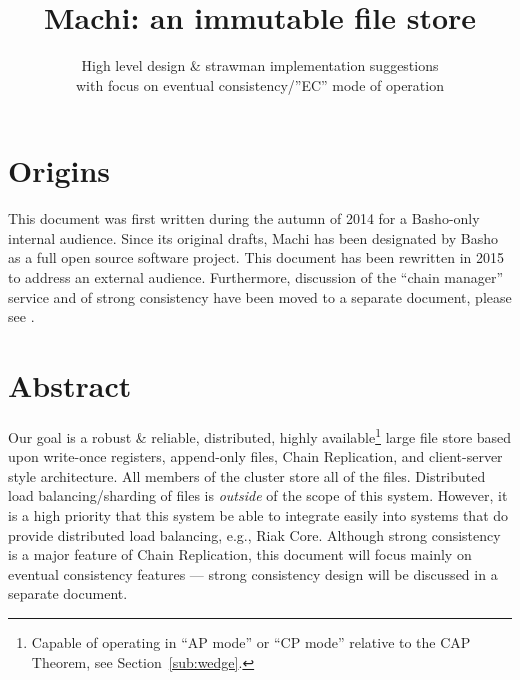 \documentclass[preprint,10pt]{sigplanconf}
\begin{document}

\conferenceinfo{}{} 


\title{Machi: an immutable file store}
\subtitle{High level design \& strawman implementation suggestions \\
          with focus on eventual consistency/''EC'' mode of operation}


\maketitle

\section{Origins}
\label{sec:origins}

This document was first written during the autumn of 2014 for a
Basho-only internal audience.  Since its original drafts, Machi has
been designated by Basho as a full open source software project.  This
document has been rewritten in 2015 to address an external audience.
Furthermore, discussion of the ``chain manager'' service and of strong
consistency have been moved to a separate document, please see
\cite{machi-chain-manager-design}.

\section{Abstract}
\label{sec:abstract}

Our goal is a robust \& reliable, distributed, highly
available\footnote{Capable of operating in ``AP mode'' or 
  ``CP mode'' relative to the CAP Theorem, see
  Section~\ref{sub:wedge}.}
large file
store based upon write-once registers, append-only files,
Chain Replication, and
client-server style architecture.  All
members of the cluster store all of the files.  Distributed load
balancing/sharding of files is {\em outside} of the scope of this system.
However, it is a high priority that this system be able to integrate
easily into systems that do provide distributed load balancing, e.g.,
Riak Core.  Although strong consistency is a major feature of Chain
Replication, this document will focus mainly on eventual consistency
features --- strong consistency design will be discussed in a separate
document.
\end{document}
